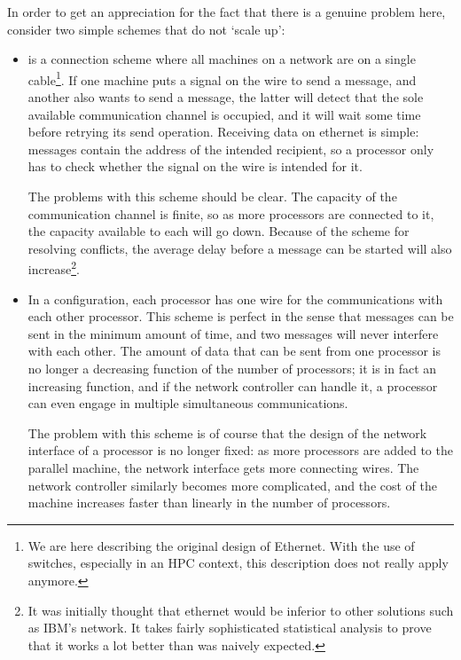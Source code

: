 In order to get an appreciation for the fact that there is a genuine
problem here, consider two
simple schemes that do not `scale up':
\begin{itemize}
\item {} is a connection scheme where all machines on a network
  are on a single cable\footnote{We are here describing the original
    design of Ethernet. With the use of switches, especially in an HPC
    context, this description does not really apply anymore.}. If one
  machine puts a signal on the wire to send a message, and another
  also wants to send a message, the latter will detect that the sole
  available communication channel is occupied, and it will wait some
  time before retrying its send operation. Receiving data on ethernet
  is simple: messages contain the address of the intended recipient,
  so a processor only has to check whether the signal on the wire is
  intended for it.

  The problems with this scheme should be clear. The capacity of the
  communication channel is finite, so as more processors are connected
  to it, the capacity available to each will go down. Because of the
  scheme for resolving conflicts, the average delay before a message
  can be started will also increase\footnote{It was initially thought
    that ethernet would be inferior to other solutions such as
    IBM's  network. It takes fairly
    sophisticated statistical analysis to prove that it works a lot
    better than was naively expected.}.
\item In a  configuration,
  each processor has one wire for
  the communications with each other processor. This scheme is perfect
  in the sense that messages can be sent in the minimum amount of time,
  and two messages will never interfere with each other.
  The amount of data that can be sent from one
  processor is no longer a decreasing function of the number of
  processors; it is in fact an increasing function, and if the
  network controller can handle it, a processor can even engage in
  multiple simultaneous communications.

  The problem with this scheme is of course that the design of the
  network interface of a processor 
  is no longer fixed: as more processors are added
  to the parallel machine, the network interface gets more
  connecting wires. The network controller similarly becomes 
  more complicated, and the cost of the machine increases faster than
  linearly in the number of processors.
\end{itemize}

